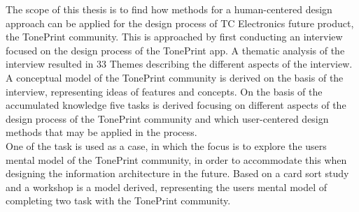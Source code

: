 The scope of this thesis is to find how methods for a human-centered design approach can be applied for the design process of TC Electronics future product, the TonePrint community. This is approached by first conducting an interview focused on the design process of the TonePrint app. A thematic analysis of the interview resulted in 33 Themes describing the different aspects of the interview. A conceptual model of the TonePrint community is derived on the basis of the interview, representing ideas of features and concepts. On the basis of the accumulated knowledge five tasks is derived focusing on different aspects of the design process of the TonePrint community and which user-centered design methods that may be applied in the process. \\
One of the task is used as a case, in which the focus is to explore the users mental model of the TonePrint community, in order to accommodate this when designing the information architecture in the future. Based on a card sort study and a workshop is a model derived, representing the users mental model of completing two task with the TonePrint community.